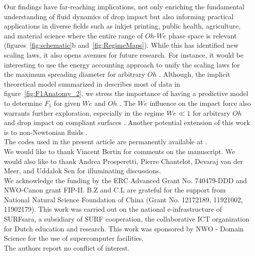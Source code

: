 \documentclass{jfm}
\begin{document}
Our findings have far-reaching implications, not only enriching the fundamental understanding of fluid dynamics of drop impact but also informing practical applications in diverse fields such as inkjet printing, public health, agriculture, and material science where the entire range of $Oh$-$We$ phase space is relevant (figures~\ref{fig:schematic}b and~\ref{fig:RegimeMaps}). While this has identified new scaling laws, it also opens avenues for future research. For instance, it would be interesting to use the energy accounting approach to unify the scaling laws for the maximum spreading diameter for arbitrary $Oh$ \citep{laan2014maximum, Wildeman2016}. Although, the implicit theoretical model summarized in \citet{cheng2021drop} describes most of data in figure~\ref{fig:F1Anatomy_2}, we stress the importance of having a predictive model to determine $F_1$ for given $We$ and $Oh$ \citep{sanjay2024PRL}. The $We$ influence on the impact force also warrants further exploration, especially in the regime $We \ll 1$ for arbitrary $Oh$ \citep{chevy2012liquid, molavcek2012quasi} and drop impact on compliant surfaces \citep{alventosa_cimpeanu_harris_2023, ma2023scaling}. Another potential extension of this work is to non-Newtonian fluids \citep{martouzet2021dynamic, aguero2022impact, bertin2023similarity, jin2023marbles}.\\[5mm] 

 The codes used in the present article are permanently available at \citet{vatsal_sanjay_2023_7598181}.\\

  We would like to thank Vincent Bertin for comments on the manuscript. We would also like to thank Andrea Prosperetti, Pierre Chantelot, Devaraj van der Meer, and Uddalok Sen for illuminating discussions.\\

 We acknowledge the funding by the ERC Advanced Grant No. 740479-DDD and NWO-Canon grant FIP-II. B.Z and C.L are grateful for the support from National Natural Science Foundation of China (Grant No. 12172189, 11921002, 11902179). This work was carried out on the national e-infrastructure of SURFsara, a subsidiary of SURF cooperation, the collaborative ICT organization for Dutch education and research. This work was sponsored by NWO - Domain Science for the use of supercomputer facilities.\\

 The authors report no conflict of interest.\\
\end{document}
